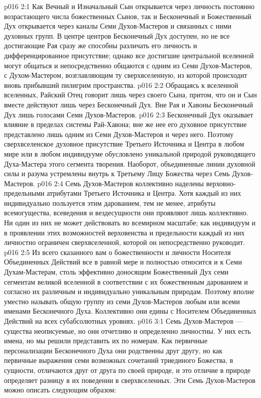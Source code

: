 \vs p016 2:1 Как Вечный и Изначальный Сын открывается через личность постоянно возрастающего числа божественных Сынов, так и Бесконечный и Божественный Дух открывается через каналы Семи Духов\hyp{}Мастеров и связанных с ними духовных групп. В центре центров Бесконечный Дух доступен, но не все достигающие Рая сразу же способны различать его личность и дифференцированное присутствие; однако все достигшие центральной вселенной могут общаться и непосредственно общаются с одним из Семи Духов\hyp{}Мастеров, с Духом\hyp{}Мастером, возглавляющим ту сверхвселенную, из которой происходит вновь прибывший пилигрим пространства.
\vs p016 2:2 Обращаясь к вселенной вселенных, Райский Отец говорит лишь через своего Сына, притом, что он и Сын вместе действуют лишь через Бесконечный Дух. Вне Рая и Хавоны Бесконечный Дух  лишь голосами Семи Духов\hyp{}Мастеров.
\vs p016 2:3 \pc Бесконечный Дух оказывает влияние  в пределах системы Рай\hyp{}Хавона; вне же нее его духовное присутствие представлено лишь одним из Семи Духов\hyp{}Мастеров и через него. Поэтому сверхвселенское духовное присутствие Третьего Источника и Центра в любом мире или в любом индивидууме обусловлено уникальной природой руководящего Духа\hyp{}Мастера этого сегмента творения. Наоборот, объединенные линии духовной силы и разума устремлены внутрь к Третьему Лицу Божества через Семь Духов\hyp{}Мастеров.
\vs p016 2:4 \pc Семь Духов\hyp{}Мастеров коллективно наделены верховно\hyp{}предельными атрибутами Третьего Источника и Центра. Хотя каждый из них индивидуально пользуется этим дарованием, тем не менее, атрибуты всемогущества, всеведения и вездесущности они проявляют лишь коллективно. Ни один из них не может действовать во всемирном масштабе; как индивидуум и в проявлении этих возможностей верховенства и предельности каждый из них личностно ограничен сверхвселенной, которой он непосредственно руководит.
\vs p016 2:5 Из всего сказанного вам о божественности и личности Носителя Объединенных Действий все в равной мере и полностью относится и к Семи Духам\hyp{}Мастерам, столь эффективно доносящим Божественный Дух семи сегментам великой вселенной в соответствии с их божественным дарованием и согласно их различным и индивидуально уникальным природам. Поэтому вполне уместно называть общую группу из семи Духов\hyp{}Мастеров любым или всеми именами Бесконечного Духа. Коллективно они едины с Носителем Объединенных Действий на всех субабсолютных уровнях.
\vs p016 3:1 Семь Духов\hyp{}Мастеров --- существа неописуемые, но они отчетливо и определенно личностны. У них есть имена, но мы решили представить их по номерам. Как первичные персонализации Бесконечного Духа они родственны друг другу, но как первичные выражения семи возможных сочетаний триединого Божества, в сущности, отличаются друг от друга по своей природе, и это отличие в природе определяет разницу в их поведении в сверхвселенных. Эти Семь Духов\hyp{}Мастеров можно описать следующим образом:
